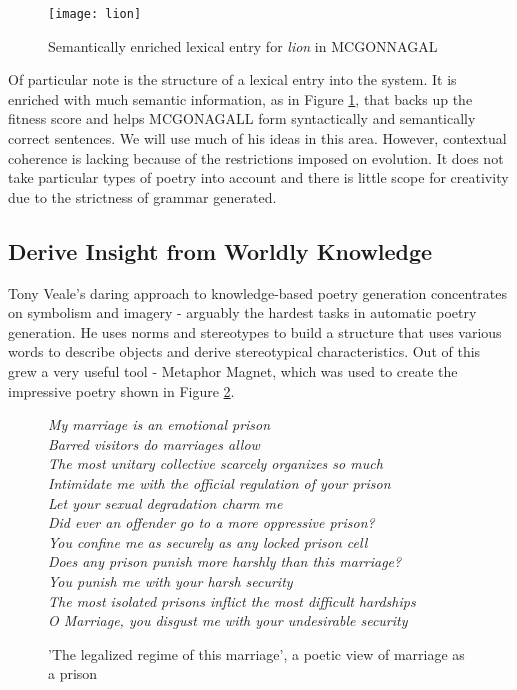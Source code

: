 \begin{figure}[h!]
\centering
\texttt{[image: lion]}
\caption{Semantically enriched lexical entry for \textit{lion} in MCGONNAGAL}
\label{fig:lion}
\end{figure}

Of particular note is the structure of a lexical entry into the system. It is enriched with much semantic information, as in Figure \ref{fig:lion}, that backs up the fitness score and helps MCGONAGALL form syntactically and semantically correct sentences. We will use much of his ideas in this area. However, contextual coherence is lacking because of the restrictions imposed on evolution. It does not take particular types of poetry into account and there is little scope for creativity due to the strictness of grammar generated. 


\subsection{Derive Insight from Worldly Knowledge}
Tony Veale's daring approach to knowledge-based poetry generation\cite{veale2013less} concentrates on symbolism and imagery - arguably the hardest tasks in automatic poetry generation. He uses norms and stereotypes to build a structure that uses various words to describe objects and derive stereotypical characteristics. Out of this grew a very useful tool - Metaphor Magnet\cite{vealespecifying}, which was used to create the impressive poetry shown in Figure \ref{fig:veale}.

\begin{figure}[h!]
\centering
\textit{
My marriage is an emotional prison\\
Barred visitors do marriages allow\\
The most unitary collective scarcely organizes so much\\
Intimidate me with the official regulation of your prison\\
Let your sexual degradation charm me\\
Did ever an offender go to a more oppressive prison?\\
You confine me as securely as any locked prison cell\\
Does any prison punish more harshly than this marriage?\\
You punish me with your harsh security\\
The most isolated prisons inflict the most difficult hardships\\
O Marriage, you disgust me with your undesirable security\\
}
\caption{'The legalized regime of this marriage', a poetic view of marriage as a prison}
\label{fig:veale}
\end{figure}

